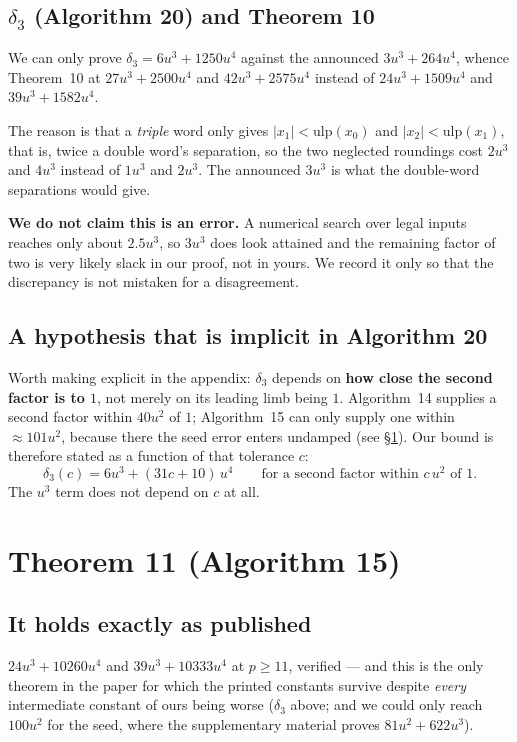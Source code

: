\documentclass[11pt,a4paper]{article}
\newcommand{\ulp}{\mathrm{ulp}}
\begin{document}
\subsection{$\delta_3$ (Algorithm 20) and Theorem 10}

We can only prove $\delta_3 = 6u^3 + 1250u^4$ against the announced
$3u^3 + 264u^4$, whence Theorem~10 at $27u^3 + 2500u^4$ and $42u^3 + 2575u^4$
instead of $24u^3 + 1509u^4$ and $39u^3 + 1582u^4$.

The reason is that a \emph{triple} word only gives $|x_1| < \ulp(x_0)$ and
$|x_2| < \ulp(x_1)$, that is, twice a double word's separation, so the two
neglected roundings cost $2u^3$ and $4u^3$ instead of $1u^3$ and $2u^3$. The
announced $3u^3$ is what the double-word separations would give.

\textbf{We do not claim this is an error.} A numerical search over legal inputs
reaches only about $2.5u^3$, so $3u^3$ does look attained and the remaining
factor of two is very likely slack in our proof, not in yours. We record it
only so that the discrepancy is not mistaken for a disagreement.

\subsection{A hypothesis that is implicit in Algorithm 20}

Worth making explicit in the appendix: $\delta_3$ depends on \textbf{how close
the second factor is to $1$}, not merely on its leading limb being $1$.
Algorithm~14 supplies a second factor within $40u^2$ of $1$; Algorithm~15 can
only supply one within $\approx 101u^2$, because there the seed error enters
undamped (see \S\ref{sec:thm11}). Our bound is therefore stated as a function
of that tolerance $c$:
\[
  \delta_3(c) = 6u^3 + (31c + 10)\,u^4
  \qquad\text{for a second factor within } c\,u^2 \text{ of } 1 .
\]
The $u^3$ term does not depend on $c$ at all.

\section{Theorem 11 (Algorithm 15)}\label{sec:thm11}

\subsection{It holds exactly as published}

$24u^3 + 10260u^4$ and $39u^3 + 10333u^4$ at $p \geq 11$, verified --- and this
is the only theorem in the paper for which the printed constants survive
despite \emph{every} intermediate constant of ours being worse ($\delta_3$
above; and we could only reach $100u^2$ for the seed, where the supplementary
material proves $81u^2 + 622u^3$).
\end{document}
